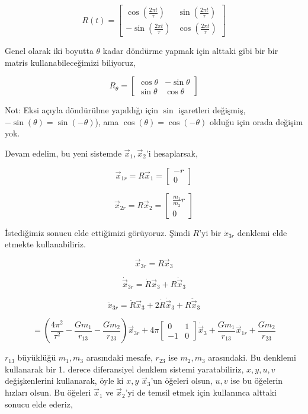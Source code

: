 \documentclass[12pt,fleqn]{article}\usepackage{../../common}
\begin{document}
$$ 
R(t) = \left[\begin{array}{rr}
\cos(\frac{2\pi t}{\tau}) & \sin(\frac{2\pi t}{\tau}) \\
-\sin(\frac{2\pi t}{\tau}) & \cos(\frac{2\pi t}{\tau}) 
\end{array}\right]
$$

Genel olarak iki boyutta $\theta$ kadar döndürme yapmak için alttaki gibi
bir bir matris kullanabileceğimizi biliyoruz,

$$ R_\theta = \left[\begin{array}{rr}
\cos \theta & -\sin \theta \\
\sin \theta & \cos \theta
\end{array}\right] $$

Not: Eksi açıyla döndürülme yapıldığı için $\sin$ işaretleri değişmiş,
$-\sin(\theta) = \sin(-\theta)$), ama $\cos(\theta) = \cos(-\theta)$ olduğu
için orada değişim yok.

Devam edelim, bu yeni sistemde $\vec{x}_1,\vec{x}_2$'i hesaplarsak,

$$ \vec{x}_{1r} = R \vec{x}_1 = \left[\begin{array}{c}-r \\ 0\end{array}\right]$$

$$ \vec{x}_{2r} = R \vec{x}_2 = \left[\begin{array}{c}\frac{m_1}{m_2}r \\ 0\end{array}\right]$$

İstediğimiz sonucu elde ettiğimizi görüyoruz. Şimdi $R$'yi bir
$\ddot{x}_{3r}$ denklemi elde etmekte kullanabiliriz.

$$ \vec{x}_{3r} = R \vec{x}_3 $$

$$ \dot{\vec{x}}_{3r} = \dot{R} \vec{x}_3 + R \dot{\vec{x}}_3$$

$$ \ddot{x}_{3r} = \ddot{R}\vec{x}_3 + 2\dot{R}\dot{\vec{x}}_3 + R \ddot{\vec{x}}_3  $$

$$ = 
\left( \frac{4\pi^2}{\tau^2} - \frac{Gm_1}{r_{13}} - \frac{Gm_2}{r_{23}} \right)\vec{x}_{3r}+
4\pi \left[\begin{array}{rrr}0 & 1 \\ -1 & 0\end{array}\right] \dot{\vec{x}}_3+
\frac{Gm_1}{r_{13}} \vec{x}_{1r} +
\frac{Gm_2}{r_{23}}
$$

$r_{13}$ büyüklüğü $m_1,m_3$ arasındaki mesafe, $r_{23}$ ise $m_2,m_3$
arasındaki. Bu denklemi kullanarak bir 1. derece diferansiyel denklem
sistemi yaratabiliriz, $x,y,u,v$ değişkenlerini kullanarak, öyle ki $x,y$
$\vec{x}_3$'un öğeleri olsun, $u,v$ ise bu öğelerin hızları olsun. Bu
öğeleri $\vec{x}_1$ ve $\vec{x}_2$'yi de temsil etmek için kullanınca
alttaki sonucu elde ederiz,
\end{document}
